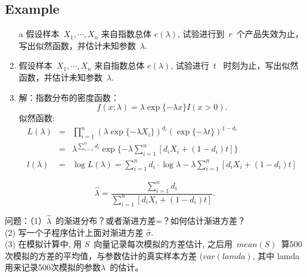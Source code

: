 \documentclass [12pt]{article}
\def\la{\lambda}
\def\x1n{{X_1,\cdots, X_n}}
\def\sig{{\sigma}}
\newcommand{\sumn}[1]{\sum\limits_{#1=1}^n}
\newcommand{\timn}[1]{\prod\limits_{#1=1}^n}
\def\la{\lambda}
\def\sig{\sigma}
\begin{document}
\begin{CJK*}{GBK}{kai}
\section{Example }
\begin{enumerate}
  \item[a] 假设样本~$\x1n$ 来自指数总体 $e(\lambda)$,
  试验进行到~$r$~个产品失效为止，写出似然函数，并估计未知参数~$\lambda$.
  \item   假设样本~$\x1n$ 来自指数总体 $e(\lambda)$,
  试验进行~$t$~ 时刻为止，写出似然函数，并估计未知参数~$\lambda$.
  \item 解：指数分布的密度函数：
$$f(x;\lambda)=\lambda \exp\{-\lambda x\} I(x>0).$$
似然函数:
\begin{eqnarray*}
  L(\lambda)&=&\timn i \left({\lambda \exp\{-\lambda X_i\}}\right)^{d_i} (\exp\{-\lambda t\})^{1-d_i} \\
   &=& \lambda^{ \sumn i d_i} \exp\{-\lambda \sumn i [d_i X_i+(1-d_i)t]\}\\
  l(\la)&=&\log L(\la)=\sumn i d_i \cdot \log \la -\la \sumn i [d_i X_i+(1-d_i)t]
\end{eqnarray*}

\end{enumerate}



$$ \hat{\la}=\frac{\sumn i d_i}{\sumn i [d_i X_i+(1-d_i)t]}.$$

问题：（1）$\hat{\la}$~的渐进分布？或者渐进方差=？如何估计渐进方差？\\
(2) 写一个子程序估计上面对渐进方差 $\hat{\sig}$.\\
(3) 在模拟计算中, 用 $S$~向量记录每次模拟的方差估计,
之后用~$mean(S)$~算500次模拟的方差的平均值，与参数估计的真实样本方差
($var(lamda)$, 其中 lamda 用来记录500次模拟的参数$\la$~的估计。



  \end{CJK*}
\end{document}

